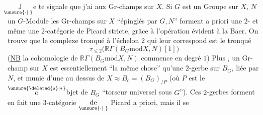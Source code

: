 
$\underset{\hspace{-0.6em}\unsure{\cdot|\phantom{\cdot}}}{\text{J}}$e te signale que j'ai  aux Gr-champs sur $X$. Si $G$ est un Groupe sur $X$, $N$ un $G$-Module
\reversemarginpar\margin{$\unsure{\cdot|\phantom{\cdot}}$}\normalmarginpar
les Gr-champs sur $X$ ``épinglés par $G,N$'' forment a priori une $2$- et même une $2$-catégorie de Picard stricte, grâce à l'opération évident à la Baer. On trouve que le complexe  tronqué à l'échelon $2$ qui leur correspond est le tronqué
\[
\tau_{\leq 2}\bigl(\mathbb R\Gamma(B_{G}\mathbin{\mathrm{mod}}X,N)[1]\bigr)
\]
(\uline{NB} la cohomologie de $\mathbb R\Gamma(B_{G}\mathbin{\mathrm{mod}}X,N)$ commence en degré $1$) Plus , un Gr-champ sur $X$   est essentiellement ``la même chose'' qu'une $2$-gerbe sur $B_{G}$, liée par $N$, et  munie d'une  au dessus de $X\approx B_{c}=(B_{G})_{/P}$ (où $P$ est le $\overset{\unsure{\deleted{s}|\ast}}{\text{o}}$bjet de $B_{G}$ ``torseur universel sous $G$''). Ces $2$-gerbes forment en fait une $3$-catégorie
$\underset{\unsure{\cdot|\phantom{\cdot}}}{\text{de}}$ Picard a priori, mais il se

